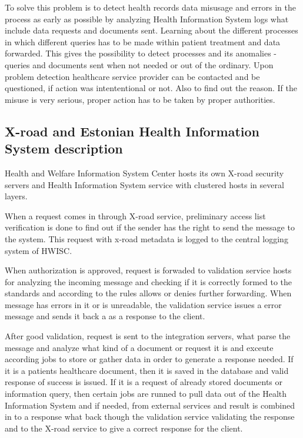 \documentclass[a4paper, 12pt]{article}
\begin{document}
To solve this problem is to detect health records data misusage and errors in the process as early as possible by analyzing Health Information System logs what include data requests and documents sent. Learning about the different processes in which different queries has to be made within patient treatment and data forwarded. This gives the possibility to detect processes and its anomalies - queries and documents sent when not needed or out of the ordinary. Upon problem detection healthcare service provider can be contacted and be questioned, if action was intententional or not. Also to find out the reason. If the misuse is very serious, proper action has to be taken by proper authorities. 

\subsection{X-road and Estonian Health Information System description}
Health and Welfare Information System Center hosts its own X-road security servers and Health Information System service with clustered hosts in several layers. 

When a request comes in through X-road service, preliminary access list verification is done to find out if the sender has the right to send the message to the system. This request with x-road metadata is logged to the central logging system of HWISC. 

When authorization is approved, request is forwaded to validation service hosts for analyzing the incoming message and checking if it is correctly formed to the standards and according to the rules allows or denies further forwarding. When message has errors in it or is unreadable, the validation service issues a error message and sends it back a as a response to the client. 

After good validation, request is sent to the integration servers, what parse the message and analyze what kind of a document or request it is and exceute according jobs to store or gather data in order to generate a response needed. If it is a patients healthcare document, then it is saved in the database and valid response of success is issued. If it is a request of already stored documents or information query, then certain jobs are runned to pull data out of the Health Information System and if needed, from external services and result is combined in to a response what back though the validation service validating the response and to the X-road service to give a correct response for the client. 
\end{document}
